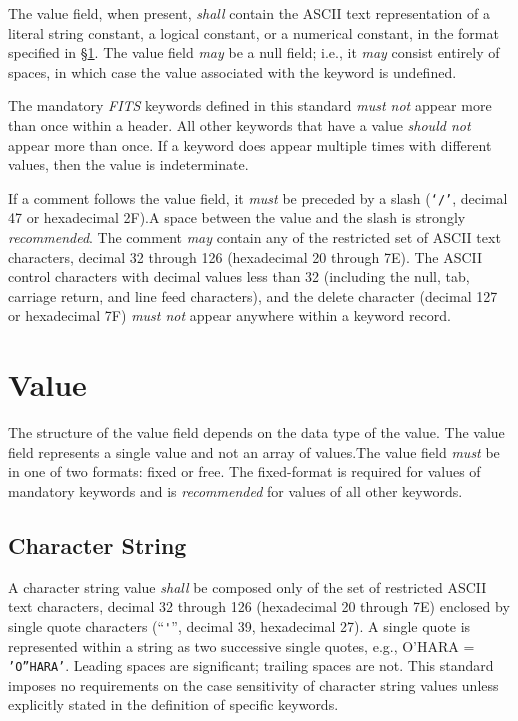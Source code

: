 \documentclass[11pt,makeidx]{book}     %
\begin{document}
   The value field, when present, {\em shall} contain the ASCII text
   representation  of a literal string constant, a logical constant, or a
   numerical constant, in the format specified in \S\ref{s:valC}.   The value
   field {\em may} be a null field; i.e., it {\em may} consist entirely of
   spaces, in which case the  value associated with the keyword is undefined.

   The mandatory {\em FITS} keywords defined in this standard
   {\em must not} appear more than once within a header.
   All other keywords that have a value {\em should not} appear more than once.
   If a keyword does appear multiple times
   with different values, then the value is indeterminate.

   If a comment follows the value field, it {\em must} be preceded by a slash
   ({\tt `/'}, decimal 47 or hexadecimal 2F).\footnotemark[1] 
   A space between the value and the
   slash is strongly {\em recommended}.  The comment {\em may}
   contain any of the restricted set of ASCII text characters,
   decimal 32 through 126 (hexadecimal
   20 through 7E).  The ASCII control
   characters with decimal values less than 32 (including the null, tab,
   carriage return, and line feed characters), and the delete character
   (decimal 127 or hexadecimal 7F) {\em must not} appear anywhere within 
   a keyword record.  

  \section{Value}
   \label{s:valC}

   The structure of the value field depends on the data type 
   of the value.  The value field represents a single value and
   not an array of values.\footnotemark[1]  The value field {\em must} be in one of two formats:
   fixed or free.
   The fixed-format is required for values of 
   mandatory keywords
   and is {\em recommended} for values of all other keywords.  

   \subsection{Character String}  
   \label{s:ffch}
   
   A character string value 
   {\em shall} be composed only of the set of restricted ASCII text
   characters, decimal 32 through 126 (hexadecimal 20 through 7E) enclosed
   by single quote characters (``\verb+'+'', decimal 39, hexadecimal 27). 
   A single quote is represented within a string as two successive 
   single quotes, e.g., O'HARA = {\tt 'O''HARA'}. Leading spaces are
   significant; trailing spaces are not. 
   This standard imposes no 
   requirements on the case sensitivity
   of character string values
   unless explicitly stated in the definition of specific
   keywords.
     
\end{document}
